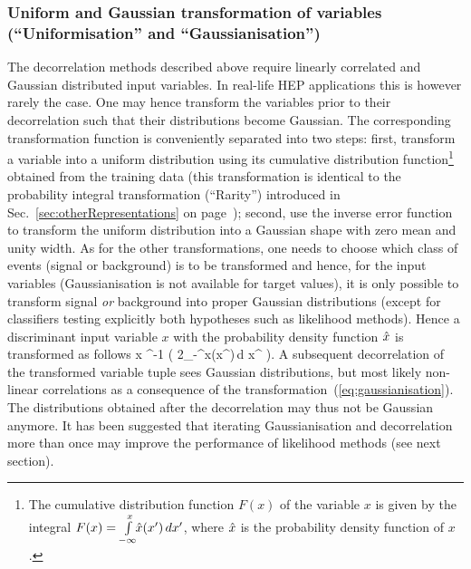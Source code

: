 \subsubsection{Uniform and Gaussian transformation of variables 
(``Uniformisation'' and ``Gaussianisation'') }
\label{sec:gaussianisation}

The decorrelation methods described above require linearly correlated and Gaussian 
distributed input variables. In real-life HEP applications this is however rarely the 
case. One may hence transform the variables prior to their decorrelation such that their 
distributions become Gaussian. The corresponding transformation function is conveniently
separated into two steps: first, transform a variable into a uniform distribution
using its cumulative distribution function\footnote
{
   The cumulative distribution function $F(x)$ of the variable $x$ is given by 
   the integral $F(x)=\int\limits_{-\infty}^{x}\!\!\hat x(x^\prime)\,d x^\prime$, where 
   $\hat x$ is the probability density function of $x$.
} 
obtained from the training data (this transformation is identical to the probability integral transformation 
(``Rarity'') 
introduced in Sec.~\ref{sec:otherRepresentations} on page~\pageref{sec:otherRepresentations});
second, use the inverse error function to transform the uniform distribution into 
a Gaussian shape with zero mean and unity width. As for the
other transformations, one needs to choose which class of events (signal or background) is to be 
transformed and hence, for the input variables (Gaussianisation is not available 
for target values), it is only possible to transform signal {\em or} background into 
proper Gaussian distributions (except for classifiers testing explicitly both
hypotheses such as likelihood methods). Hence a discriminant input variable $x$ 
with the probability density function  $\hat x$ is transformed as follows 
\beq
\label{eq:gaussianisation}
   x \mapsto {}^{-1}\!\!
             \left( 2\cdot \!\!\intl_{-\infty}^{x}\!\!\xPDF(x^\prime)\,d x^ \right)\:.
\eeq
A subsequent decorrelation of the transformed variable tuple sees Gaussian 
distributions, but most likely non-linear correlations as a consequence of the 
transformation~(\ref{eq:gaussianisation}). The distributions obtained after the 
decorrelation may thus not be Gaussian anymore. It has been suggested that 
iterating Gaussianisation and decorrelation more than once may improve the 
performance of likelihood methods (see next section).

